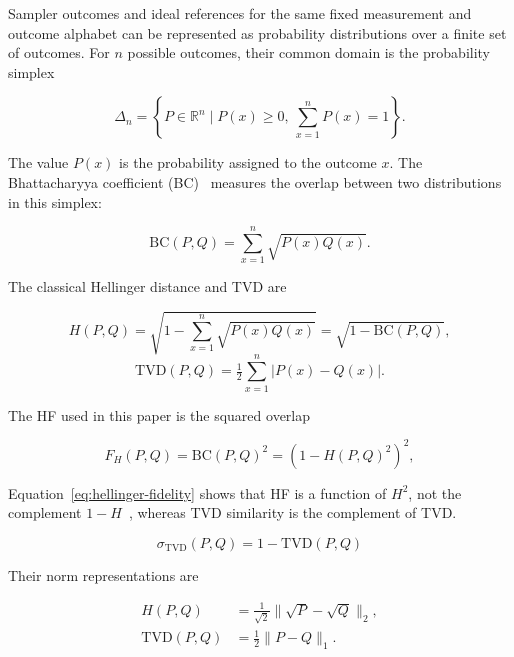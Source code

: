 \documentclass[10pt,conference]{IEEEtran}
\newcommand{\TVD}{\mathrm{TVD}}
\newcommand{\BC}{\mathrm{BC}}
\newcommand{\HF}{F_{H}}
\begin{document}
Sampler outcomes and ideal references for the same fixed measurement and outcome alphabet can be represented as probability distributions over a finite set of outcomes. For $n$ possible outcomes, their common domain is the probability simplex

\begin{equation}
\Delta_n=
\left\{P\in\mathbb{R}^{n}\mid
P(x)\ge0,\ \sum_{x=1}^{n}P(x)=1\right\}.
\label{eq:probability-simplex}
\end{equation}

The value $P(x)$ is the probability assigned to the outcome $x$. The Bhattacharyya coefficient (BC)~\cite{bhattacharyya1943} measures the overlap between two distributions in this simplex:

\begin{equation}
\BC(P,Q)=\sum_{x=1}^{n}\sqrt{P(x)Q(x)}.
\label{eq:bhattacharyya-coefficient}
\end{equation}

The classical Hellinger distance and TVD are

\begin{equation}
H(P,Q)=\sqrt{1-\sum_{x=1}^{n}\sqrt{P(x)Q(x)}}
=\sqrt{1-\BC(P,Q)},
\label{eq:hellinger-distance}
\end{equation}
\begin{equation}
\TVD(P,Q)=\tfrac12\sum_{x=1}^{n}\lvert P(x)-Q(x)\rvert.
\label{eq:tvd}
\end{equation}

The HF used in this paper is the squared overlap

\begin{equation}
\HF(P,Q)=\BC(P,Q)^{2}=(1-H(P,Q)^{2})^{2},
\label{eq:hellinger-fidelity}
\end{equation}

Equation~\ref{eq:hellinger-fidelity} shows that HF is a function of $H^2$, not the complement $1-H$~\cite{cha2007}, whereas TVD similarity is the complement of TVD.

\begin{equation}
\sigma_{\TVD}(P,Q)=1-\TVD(P,Q)
\label{eq:tvd-similarity-definition}
\end{equation}

Their norm representations are

\begin{align}
H(P,Q)&=\tfrac{1}{\sqrt{2}}\lVert\sqrt{P}-\sqrt{Q}\rVert_{2},
\label{eq:hellinger-l2}\\
\TVD(P,Q)&=\tfrac{1}{2}\lVert P-Q\rVert_{1}.
\label{eq:tvd-l1}
\end{align}
\end{document}
